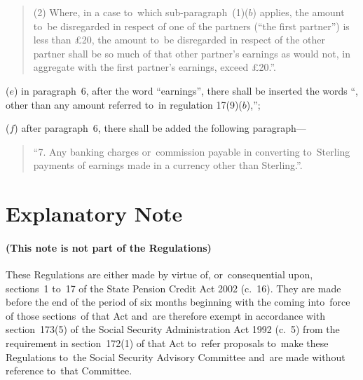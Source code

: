 \documentclass[12pt,a4paper]{article}
\begin{document}
\begin{enumerate}
\begin{quotation}
(2) Where, in a case to~which sub-paragraph~(1)($b$)  applies, the amount to~be disregarded in respect of one of the partners (“the first partner”) is less than £20, the amount to~be disregarded in respect of the other partner shall be so much of that other partner’s earnings as would not, in aggregate with the first partner’s earnings, exceed £20.”.
\end{quotation}

($e$) in paragraph~6, after the word “earnings”, there shall be inserted the words “, other than any amount referred to~in regulation 17(9)($b$),”;

($f$) after paragraph~6, there shall be added the following paragraph—
\begin{quotation}
“7.  Any banking charges or~commission payable in converting to~Sterling payments of earnings made in a currency other than Sterling.”.
\end{quotation}
\end{enumerate}

\part{Explanatory Note}

\renewcommand\parthead{— Explanatory Note}

\subsection*{(This note is not part of the Regulations)}

These Regulations are either made by virtue of, or~consequential upon, sections~1 to~17 of the State Pension Credit Act 2002 (c.~16). They are made before the end of the period of six months beginning with the coming into~force of those sections~of that Act and~are therefore exempt in accordance with section~173(5) of the Social Security Administration Act 1992 (c.~5) from the requirement in section~172(1) of that Act to~refer proposals to~make these Regulations to~the Social Security Advisory Committee and~are made without reference to~that Committee.
\end{document}
